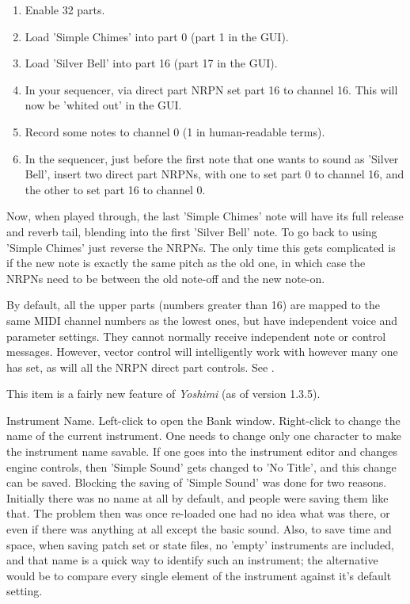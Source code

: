    \begin{enumerate}
      \item Enable 32 parts.
      \item Load 'Simple Chimes' into part 0 (part 1 in the GUI).
      \item Load 'Silver Bell' into part 16 (part 17 in the GUI).
      \item In your sequencer, via direct part NRPN set part 16 to channel 16.
          This will now be 'whited out' in the GUI.
      \item Record some notes to channel 0 (1 in human-readable terms).
      \item In the sequencer, just before the first note that one wants to
         sound as 'Silver Bell', insert two direct part NRPNs, with one to set
         part 0 to channel 16, and the other to set part 16 to channel 0.
   \end{enumerate}

   Now, when played through, the last 'Simple Chimes' note will have its full
   release and reverb tail, blending into the first 'Silver Bell' note.  To go
   back to using 'Simple Chimes' just reverse the NRPNs.  The only time this
   gets complicated is if the new note is exactly the same pitch as the old
   one, in which case the NRPNs need to be between the old note-off and the new
   note-on.

   By default, all the upper parts (numbers greater than 16)
   are mapped to the same MIDI channel
   numbers as the lowest ones, but have independent voice and parameter
   settings. They cannot normally receive independent note or control
   messages. However, vector control will intelligently work with however
   many one has set, as will all the NRPN direct part controls.
   See .

   This item is a fairly new feature of \textsl{Yoshimi} (as of version
   1.3.5).

   Instrument Name.
   Left-click to open the Bank window.
   Right-click to change the name of the current instrument.
   One needs to change only one character to make the instrument name
   savable. If one goes into the instrument editor and
   changes engine controls, then 'Simple Sound' gets changed to 'No Title',
   and this change can be saved.
   Blocking the saving of 'Simple Sound' was done for two reasons.
   Initially there was no name at all by default, and people were saving them
   like that. The problem then was once re-loaded one had no idea what was
   there, or even if there was anything at all except the basic sound.
   Also, to save time and space, when saving patch set or state files, no
   'empty' instruments are included, and that name is a quick way to
   identify such an instrument; the alternative would be to compare every
   single element of the instrument against it's default setting.

